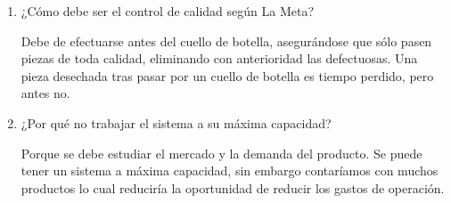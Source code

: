 \documentclass[12pt, letterpaper]{article}
\begin{document}
\begin{enumerate}
	\item ¿Cómo debe ser el control de calidad según La Meta?

		Debe de efectuarse antes del cuello de botella, asegurándose que sólo pasen piezas de toda calidad, eliminando con anterioridad las defectuosas. Una pieza desechada tras pasar por un cuello de botella es tiempo perdido, pero antes no.

	\item ¿Por qué no trabajar el sistema a su máxima capacidad?

		Porque se debe estudiar el mercado y la demanda del producto. Se puede tener un sistema a máxima capacidad, sin embargo contaríamos con muchos productos lo cual reduciría la oportunidad de reducir los gastos de operación.

\end{enumerate}

\renewcommand\refname{References}
\printbibliography
\end{document}
